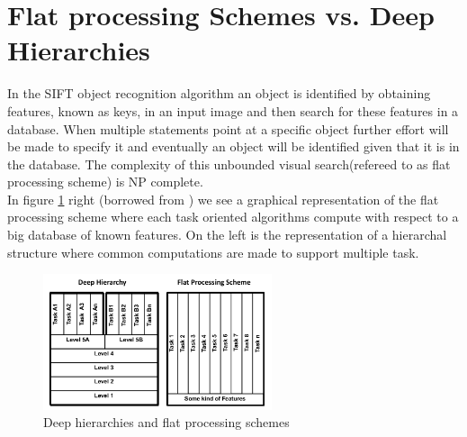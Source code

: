 \section{Flat processing Schemes vs. Deep Hierarchies}

In the SIFT object recognition algorithm an object is identified by obtaining features, known as keys, in an input image and then search for these features in a database. When multiple statements point at a specific object further effort will be made to specify it and eventually an object will be identified given that it is in the database. The complexity of this unbounded visual search(refereed to as flat processing scheme) is NP complete\citep{fidler2009learning}.\\
In figure \ref{fig:deepvsflat} right (borrowed from \citep{VisualHierarchy}) we see a graphical representation of the flat processing scheme where each task oriented algorithms compute with respect to a big database of known features. On the left is the representation of a hierarchal structure where common computations are made to support multiple task.

\begin{figure}[h!] %
\centering
\includegraphics[width=0.6\textwidth]{graphics/deepvsflat}
\caption{Deep hierarchies and flat processing schemes}
\label{fig:deepvsflat}
\end{figure}

